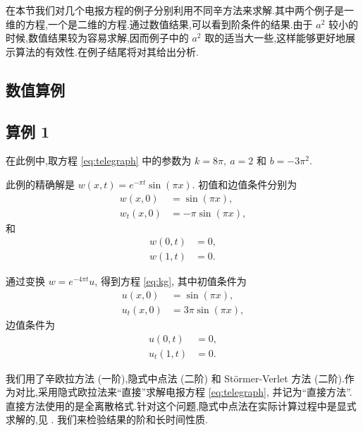 在本节我们对几个电报方程的例子分别利用不同辛方法来求解.其中两个例子是一维的方程,一个是二维的方程.通过数值结果,可以看到阶条件的结果.由于 $a^2$ 较小的时候,数值结果较为容易求解,因而例子中的 $a^2$ 取的适当大一些,这样能够更好地展示算法的有效性.在例子结尾将对其给出分析.

\subsection{数值算例}

\subsection*{算例 1}
在此例中,取方程 \eqref{eq:telegraph} 中的参数为 $k = 8\pi,~a = 2$ 和 $b
= -3\pi^2$.

此例的精确解是 $w(x,t) = e^{-\pi t}\sin(\pi x)$. 初值和边值条件分别为
\begin{equation*}
\begin{aligned}
w(x,0)&=\sin(\pi x),\\
w_t(x,0)&=-\pi \sin(\pi x),
\end{aligned}
\end{equation*}
和
\begin{equation*}
\begin{aligned}
w(0,t)&=0,\\
w(1,t)&=0.
\end{aligned}
\end{equation*}

通过变换 $w = e^{-4\pi t}u$, 得到方程 \eqref{eq:kg}, 其中初值条件为
\begin{equation*}
\begin{aligned}
u(x,0)&=\sin(\pi x),\\
u_t(x,0)&=3\pi \sin(\pi x),
\end{aligned}
\end{equation*}
边值条件为
\begin{equation*}
\begin{aligned}
u(0,t)&=0,\\
u_t(1,t)&=0.
\end{aligned}
\end{equation*}

我们用了辛欧拉方法 (一阶),隐式中点法 (二阶) 和 St\"{o}rmer-Verlet 方法 (二阶).作为对比,采用隐式欧拉法来``直接''求解电报方程 \eqref{eq:telegraph}, 并记为``直接方法''.直接方法使用的是全离散格式.针对这个问题,隐式中点法在实际计算过程中是显式求解的,见 \cite{feng2010symplectic}. 我们来检验结果的阶和长时间性质.

